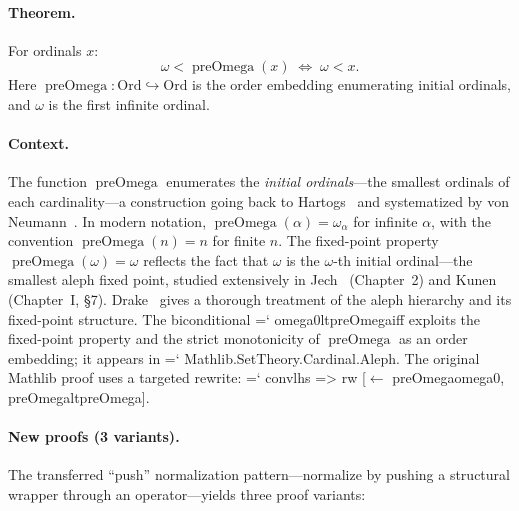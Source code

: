 \documentclass[11pt]{article}
\renewcommand{\texttt}[1]{%
  \begingroup\ttfamily\hyphenchar\font=`\-\relax
  \def\_{\textunderscore\discretionary{}{}{}}%
  #1\endgroup}
\theoremstyle{definition}
\theoremstyle{remark}
\begin{document}
\paragraph{Theorem.}
For ordinals $x$:
\[
  \omega < \operatorname{preOmega}(x)
    \;\Longleftrightarrow\; \omega < x.
\]
Here $\operatorname{preOmega} : \mathrm{Ord} \hookrightarrow
\mathrm{Ord}$ is the order embedding enumerating initial ordinals,
and $\omega$ is the first infinite ordinal.

\paragraph{Context.}
The function $\operatorname{preOmega}$ enumerates the \emph{initial
ordinals}---the smallest ordinals of each cardinality---a
construction going back to Hartogs~\cite{hartogs_1915} and
systematized by von Neumann~\cite{von_neumann_1923}.  In modern
notation, $\operatorname{preOmega}(\alpha) = \omega_\alpha$ for
infinite $\alpha$, with the convention
$\operatorname{preOmega}(n) = n$ for finite $n$.  The fixed-point
property $\operatorname{preOmega}(\omega) = \omega$ reflects the
fact that $\omega$ is the $\omega$-th initial ordinal---the
smallest aleph fixed point, studied extensively in
Jech~\cite{jech_set_theory_2003} (Chapter~2) and
Kunen~\cite{kunen_set_theory_2011} (Chapter~I, \S7).
Drake~\cite{drake_1974} gives a thorough treatment of the aleph
hierarchy and its fixed-point structure.  The biconditional
\texttt{omega0\_lt\_preOmega\_iff} exploits the fixed-point property
and the strict monotonicity of $\operatorname{preOmega}$ as an
order embedding; it appears in
\texttt{Mathlib.SetTheory.Cardinal.Aleph}.  The original Mathlib
proof uses a targeted rewrite:
\texttt{conv\_lhs => rw [$\leftarrow$ preOmega\_omega0,
preOmega\_lt\_preOmega]}.

\paragraph{New proofs (3 variants).}
The transferred ``push'' normalization pattern---normalize by pushing a
structural wrapper through an operator---yields three proof variants:
\end{document}
